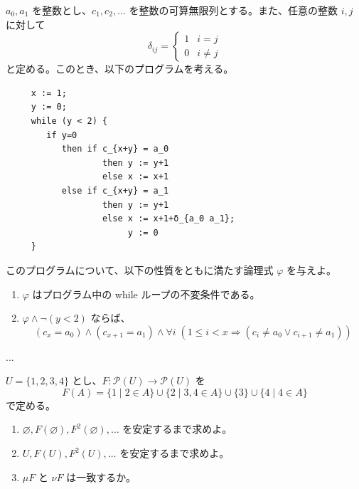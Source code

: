 \documentclass[
		head_space=20mm,
		foot_space=20mm,
		gutter=10mm,
		line_length=190mm
]{jlreq}
\begin{document}
\clearpage

\begin{practice}[ループ不変量] %
	$a_0,a_1$ を整数とし、$c_1,c_2,\dots$ を整数の可算無限列とする。また、任意の整数 $i,j$ に対して \[\textstyle\delta_{ij}=\begin{cases}1 & i=j\\0 & i\neq j\end{cases}\] と定める。このとき、以下のプログラムを考える。
	\begin{verbatim}
	 x := 1;
	 y := 0;
	 while (y < 2) {
	    if y=0
	       then if c_{x+y} = a_0 
	               then y := y+1
	               else x := x+1
	       else if c_{x+y} = a_1
	               then y := y+1
	               else x := x+1+δ_{a_0 a_1}; 
	                    y := 0
	 }\end{verbatim}
	このプログラムについて、以下の性質をともに満たす論理式 $\varphi$ を与えよ。
	\begin{enumerate}
		\item $\varphi$ はプログラム中の while ループの不変条件である。
		\item $\varphi\land\lnot(y<2)$ ならば、\[(c_x=a_0)\land(c_{x+1}=a_1)\land\forall i\;(1\leq i < x\Rightarrow(c_i\neq a_0\lor c_{i+1}\neq a_1))\]
	\end{enumerate}
\end{practice}

\begin{answer}
	... 
\end{answer}







\clearpage

\begin{practice}[不動点]
	$U=\{1,2,3,4\}$ とし、$F:\mathcal P(U)\to\mathcal P(U)$ を 
	\[F(A)=\{1\mid 2\in A\}\cup\{2\mid 3,4\in A\}\cup\{3\}\cup\{4\mid4\in A\}\] 
	で定める。
	\begin{enumerate}
		\item $\varnothing,F(\varnothing),F^2(\varnothing),\ldots$ を安定するまで求めよ。
		\item $U,F(U),F^2(U),\ldots$ を安定するまで求めよ。
		\item $\mu F$ と $\nu F$ は一致するか。
	\end{enumerate}
\end{practice}
\end{document}
